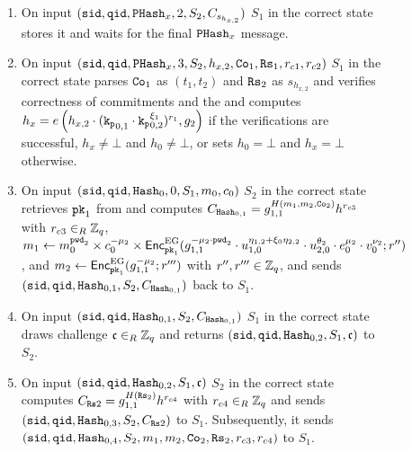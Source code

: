 \begin{figure}[htbp]
\begin{mdframed}[innertopmargin=10pt]
\begin{enumerate}
	    \item On input $(\mathtt{sid},\mathtt{qid},\mathtt{PHash}_x,2,S_2,C_{s_{h_{x,2}}})$ $S_1$ in the correct state stores it and waits for the final $\mathtt{PHash}_x$ message.
	    
	    \item On input $(\mathtt{sid},\mathtt{qid},\mathtt{PHash}_x,3,S_2,h_{x,2}, \mathtt{Co}_1, \mathtt{Rs}_1, r_{c1}, r_{c2})$ $S_1$ in the correct state parses $\mathtt{Co}_1$ as $(t_1,t_2)$ and $\mathtt{Rs}_2$ as $s_{h_{x,2}}$ and verifies correctness of commitments and the \ZKP
	     and computes
 	    $h_x = e\left( h_{x,2}\cdot (\mathtt{k_p}_{0,1} \cdot \mathtt{k_p}_{0,2}^{\xi_1})^{r_1}, g_2 \right)$
 	    if the verifications are successful, $h_x\not=\bot$ and $h_0\not=\bot$, or sets $h_0=\bot$ and $h_x=\bot$ otherwise.
	    
	    
	    \item On input $(\mathtt{sid},\mathtt{qid},\mathtt{Hash}_0,0,S_1,m_0,c_0)$ $S_2$ in the correct state retrieves $\mathtt{pk}_1$ from \Fca and computes
	      $C_{\mathtt{Hash}_{0,1}}=g_{1,1}^{H(m_{1},m_{2},\mathtt{Co}_2)} h^{r_{c3}}$
	      with $r_{c3}\in_R\mathbb{Z}_q$,
	      $m_{1}\gets m_0^{\pwd_2} \times c_0^{-\mu_2} \times \Enc_{\pk_1}^\EG(g_{1,1}^{-\mu_2\cdot {\pwd_2}} \cdot u_{1,0}^{\eta_{1,2}+\xi_0\eta_{2,2}} \cdot u_{2,0}^{\theta_2} \cdot e_0^{\mu_2} \cdot v_0^{\nu_2}; r'')$, and $m_{2}\gets \mathsf{Enc}_{\mathtt{pk}_1}^\mathrm{EG}(g_{1,1}^{-\mu_2}; r''')$ with $r'',r'''\in\mathbb{Z}_q$,
	      and sends $(\mathtt{sid},\mathtt{qid},\mathtt{Hash}_{0,1},S_2,C_{\mathtt{Hash}_{0,1}})$ back to $S_1$.
	      
	    \item On input $(\mathtt{sid},\mathtt{qid},\mathtt{Hash}_{0,1},S_2,C_{\mathtt{Hash}_{0,1}})$ $S_1$ in the correct state draws challenge $\mathfrak{c}\in_R\mathbb{Z}_q$ and returns $(\mathtt{sid},\mathtt{qid},\mathtt{Hash}_{0,2},S_1,\mathfrak{c})$ to $S_2$. 
	    
	    \item On input $(\mathtt{sid},\mathtt{qid},\mathtt{Hash}_{0,2},S_1,\mathfrak{c})$ $S_2$ in the correct state computes
	    $C_{\mathtt{Rs}2}=g_{1,1}^{H(\mathtt{Rs}_{2})} h^{r_{c4}}$ with $r_{c4}\in_R\mathbb{Z}_q$
	    and sends $(\mathtt{sid},\mathtt{qid},\mathtt{Hash}_{0,3},S_2,C_{\mathtt{Rs}2})$ to $S_1$.
	    Subsequently, it sends $(\mathtt{sid},\mathtt{qid},\mathtt{Hash}_{0,4},S_2, m_1, m_2, \mathtt{Co}_2, \mathtt{Rs}_2, r_{c3}, r_{c4})$ to $S_1$.
	    

\end{enumerate}
\end{mdframed}
\end{figure}
